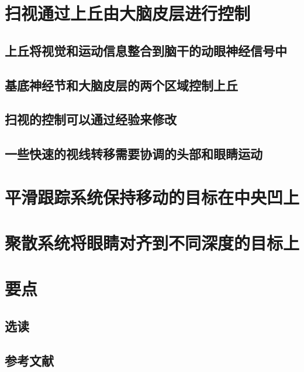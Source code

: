 \section{扫视通过上丘由大脑皮层进行控制}
\subsection{上丘将视觉和运动信息整合到脑干的动眼神经信号中}
\subsection{基底神经节和大脑皮层的两个区域控制上丘}
\subsection{扫视的控制可以通过经验来修改}
\subsection{一些快速的视线转移需要协调的头部和眼睛运动}

\section{平滑跟踪系统保持移动的目标在中央凹上}

\section{聚散系统将眼睛对齐到不同深度的目标上}

\section{要点}
\subsection{选读}
\subsection{参考文献}


